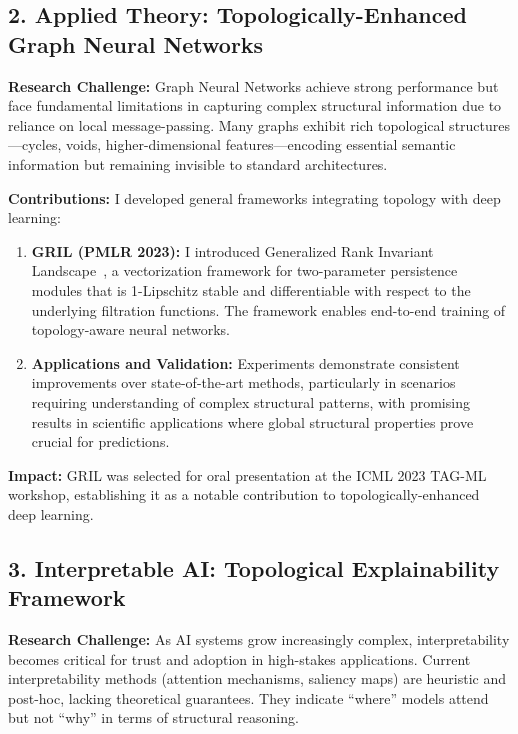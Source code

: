 \documentclass[11pt,letterpaper]{article}
\begin{document}
\vspace{-0.1in}
\subsection*{2. Applied Theory: Topologically-Enhanced Graph Neural Networks}

\textbf{Research Challenge:} Graph Neural Networks achieve strong performance but face fundamental limitations in capturing complex structural information due to reliance on local message-passing. Many graphs exhibit rich topological structures—cycles, voids, higher-dimensional features—encoding essential semantic information but remaining invisible to standard architectures.

\textbf{Contributions:} I developed general frameworks integrating topology with deep learning:

\begin{enumerate}
    \item \textbf{GRIL (PMLR 2023):} I introduced Generalized Rank Invariant Landscape~\cite{gril-xin23a-pmlr}, a vectorization framework for two-parameter persistence modules that is 1-Lipschitz stable and differentiable with respect to the underlying filtration functions. The framework enables end-to-end training of topology-aware neural networks.

    \item \textbf{Applications and Validation:} Experiments demonstrate consistent improvements over state-of-the-art methods, particularly in scenarios requiring understanding of complex structural patterns, with promising results in scientific applications where global structural properties prove crucial for predictions.
\end{enumerate}

\textbf{Impact:} GRIL was selected for oral presentation at the ICML 2023 TAG-ML workshop, establishing it as a notable contribution to topologically-enhanced deep learning.

\vspace{-0.1in}
\subsection*{3. Interpretable AI: Topological Explainability Framework}

\textbf{Research Challenge:} As AI systems grow increasingly complex, interpretability becomes critical for trust and adoption in high-stakes applications. Current interpretability methods (attention mechanisms, saliency maps) are heuristic and post-hoc, lacking theoretical guarantees. They indicate ``where'' models attend but not ``why'' in terms of structural reasoning.
\end{document}
